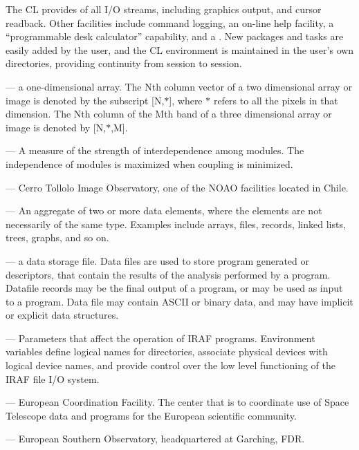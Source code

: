 The CL provides  of all I/O streams, including graphics
output, and cursor readback. Other facilities include command logging, an
on-line help facility, a ``programmable desk
calculator'' capability, and a .
New packages and tasks are easily added by the user,
and the CL environment is maintained in the user's own directories,
providing continuity from session to session.

\medskip \noindent {} --- a one-dimensional array. The Nth
column vector of a two dimensional array or image is denoted
by the subscript [N,$*$],
where $*$ refers to all the pixels in that dimension.
The Nth column of the Mth band of a three dimensional array or image
is denoted by [N,$*$,M].

\medskip \noindent {} --- A measure of the strength of
interdependence among modules.
The independence of modules is maximized when coupling is minimized.

\medskip \noindent {} --- Cerro Tollolo Image Observatory,
one of the NOAO facilities located in Chile.

\medskip \noindent {} --- An aggregate of two or more 
data elements, where the elements are not necessarily of the same type. 
Examples include arrays, files, rec\-ords, linked lists, 
trees, graphs, and so on.

\medskip \noindent {} --- a data storage file.  Data
files are used to store program generated  or descriptors,
that contain the results
of the analysis performed by a program.  Datafile records may be the
final output of a program, or may be used as input to a program.  Data
file may contain ASCII or binary data, and may have implicit or explicit
data structures.

\medskip \noindent {} --- Parameters that
affect the operation of  IRAF programs.
Environment variables define logical names for directories, associate 
physical devices with logical device names, and provide control
over the low level functioning of the IRAF file I/O system.

\medskip \noindent {} --- European Coordination Facility. The
center that is to coordinate use of Space Telescope data and programs for 
the European scientific community.

\medskip \noindent {} ---  European Southern Observatory,
headquartered at Garching, FDR.

